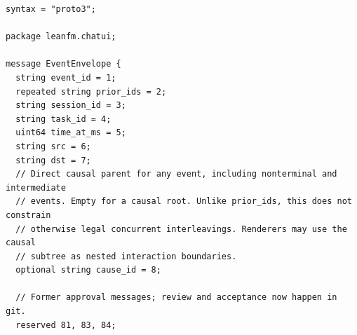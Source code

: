 \begin{lstlisting}[language={},basicstyle=\ttfamily\tiny,breaklines=true]
syntax = "proto3";

package leanfm.chatui;

message EventEnvelope {
  string event_id = 1;
  repeated string prior_ids = 2;
  string session_id = 3;
  string task_id = 4;
  uint64 time_at_ms = 5;
  string src = 6;
  string dst = 7;
  // Direct causal parent for any event, including nonterminal and intermediate
  // events. Empty for a causal root. Unlike prior_ids, this does not constrain
  // otherwise legal concurrent interleavings. Renderers may use the causal
  // subtree as nested interaction boundaries.
  optional string cause_id = 8;

  // Former approval messages; review and acceptance now happen in git.
  reserved 81, 83, 84;


\end{lstlisting}
